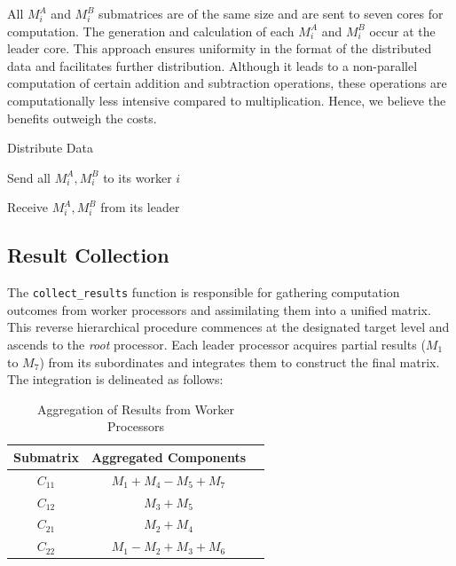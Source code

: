 \documentclass[12pt,a4paper]{article}
\begin{document}
All $M^A_i$ and $M^B_i$ submatrices are of the same size and are sent to seven cores for computation. The generation and calculation of each $M^A_i$ and $M^B_i$ occur at the leader core. 
This approach ensures uniformity in the format of the distributed data and facilitates further distribution. 
Although it leads to a non-parallel computation of certain addition and subtraction operations, 
these operations are computationally less intensive compared to multiplication. Hence, we believe the benefits outweigh the costs.

\begin{algorithm}[htbp]
    \caption{Distribute Data}
    \label{alg:distribute_data}
    \begin{algorithmic}[1]
            \State Send all $M^A_i, M^B_i$ to its worker $i$
        \EndIf
        
            \State Receive $M^A_i, M^B_i$ from its leader
       \EndIf
    \EndProcedure
    \end{algorithmic}
\end{algorithm}


\subsection{Result Collection}
The \texttt{collect\_results} function is responsible for gathering computation outcomes from worker processors and assimilating them into a unified matrix. This reverse hierarchical procedure commences at the designated target level and ascends to the \textit{root} processor. Each leader processor acquires partial results ($M_1$ to $M_7$) from its subordinates and integrates them to construct the final matrix. The integration is delineated as follows:

\begin{table}[htbp]
\centering
\begin{tabular}{ccl}
\toprule
\textbf{Submatrix} & \textbf{Aggregated Components} \\
\midrule
$C_{11}$ & $M_1 + M_4 - M_5 + M_7$ \\
$C_{12}$ & $M_3 + M_5$ \\
$C_{21}$ & $M_2 + M_4$ \\
$C_{22}$ & $M_1 - M_2 + M_3 + M_6$ \\
\bottomrule
\end{tabular}
\caption{Aggregation of Results from Worker Processors}
\label{tab:aggregation}
\end{table}
\end{document}
